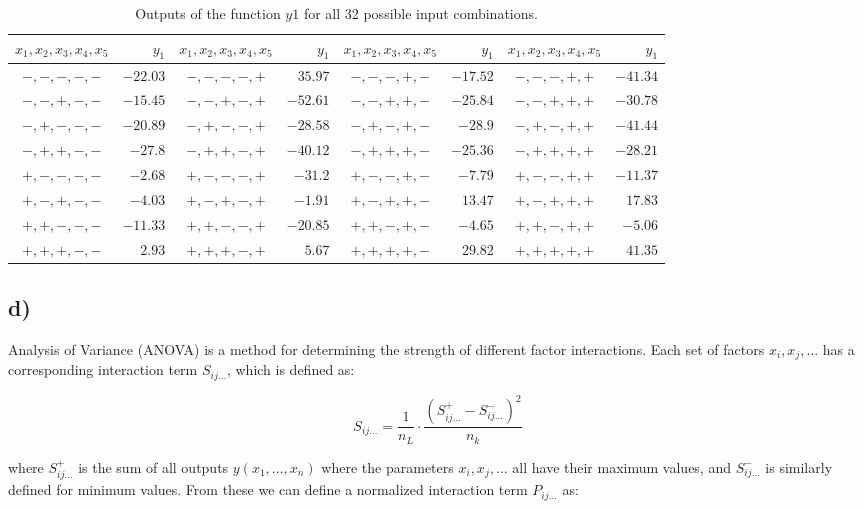 \begin{table}[h!]
\centering
\begin{tabular}{cr|cr|cr|cr}
	$x_1, x_2, x_3, x_4, x_5$ & $y_1$ &$x_1, x_2, x_3, x_4, x_5$ & $y_1$ &$x_1, x_2, x_3, x_4, x_5$ & $y_1$ &$x_1, x_2, x_3, x_4, x_5$ & $y_1$ \\
	\hline
	$-,-,-,-,-$ & $-22.03$ & $-,-,-,-,+$ &  $35.97$ & $-,-,-,+,-$ & $-17.52$ & $-,-,-,+,+$ & $-41.34$ \\
	$-,-,+,-,-$ & $-15.45$ & $-,-,+,-,+$ & $-52.61$ & $-,-,+,+,-$ & $-25.84$ & $-,-,+,+,+$ & $-30.78$ \\
	$-,+,-,-,-$ & $-20.89$ & $-,+,-,-,+$ & $-28.58$ & $-,+,-,+,-$ &  $-28.9$ & $-,+,-,+,+$ & $-41.44$ \\
	$-,+,+,-,-$ &  $-27.8$ & $-,+,+,-,+$ & $-40.12$ & $-,+,+,+,-$ & $-25.36$ & $-,+,+,+,+$ & $-28.21$ \\
	$+,-,-,-,-$ &  $-2.68$ & $+,-,-,-,+$ &  $-31.2$ & $+,-,-,+,-$ &  $-7.79$ & $+,-,-,+,+$ & $-11.37$ \\
	$+,-,+,-,-$ &  $-4.03$ & $+,-,+,-,+$ &  $-1.91$ & $+,-,+,+,-$ &  $13.47$ & $+,-,+,+,+$ &  $17.83$ \\
	$+,+,-,-,-$ & $-11.33$ & $+,+,-,-,+$ & $-20.85$ & $+,+,-,+,-$ &  $-4.65$ & $+,+,-,+,+$ &  $-5.06$ \\
	$+,+,+,-,-$ &   $2.93$ & $+,+,+,-,+$ &   $5.67$ & $+,+,+,+,-$ &  $29.82$ & $+,+,+,+,+$ &  $41.35$ \\
\end{tabular}
\caption{Outputs of the function $y1$ for all 32 possible input combinations.}
\label{tab:outputs_y1}
\end{table}

\subsection*{d)}

Analysis of Variance (ANOVA) is a method for determining the strength of different factor interactions. Each set of factors $x_i, x_j, \dots$ has a corresponding interaction term $S_{ij\dots}$, which is defined as:

\begin{equation}
	S_{ij\dots} = \frac{1}{n_L} \cdot \frac{(S_{ij\dots}^+ - S_{ij\dots}^-)^2}{n_k}
\end{equation}

where $S_{ij\dots}^+$ is the sum of all outputs $y(x_1, \dots, x_n)$ where the parameters $x_i, x_j, \dots$ all have their maximum values, and $S_{ij\dots}^-$ is similarly defined for minimum values. From these we can define a normalized interaction term $P_{ij\dots}$ as:

